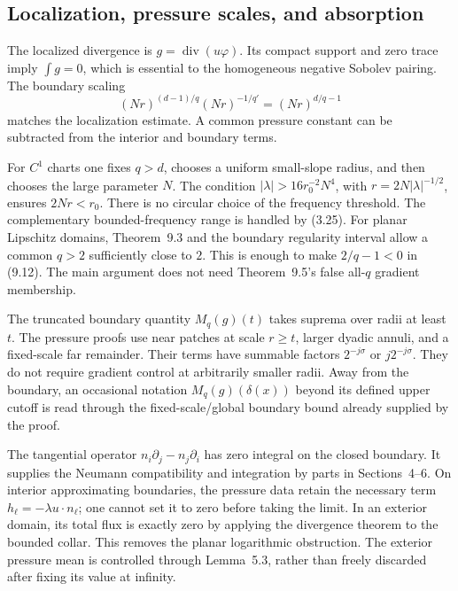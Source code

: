 \documentclass[10pt]{article}
\begin{document}
\subsection*{Localization, pressure scales, and absorption}
The localized divergence is \(g=\operatorname{div}(u\varphi)\). Its compact support and zero trace imply \(\int g=0\), which is essential to the homogeneous negative Sobolev pairing. The boundary scaling \[(Nr)^{(d-1)/q}(Nr)^{-1/q'}=(Nr)^{d/q-1}\] matches the localization estimate. A common pressure constant can be subtracted from the interior and boundary terms.\par
For \(C^1\) charts one fixes \(q>d\), chooses a uniform small-slope radius, and then chooses the large parameter \(N\). The condition \(|\lambda|>16r_0^{-2}N^4\), with \(r=2N|\lambda|^{-1/2}\), ensures \(2Nr<r_0\). There is no circular choice of the frequency threshold. The complementary bounded-frequency range is handled by (3.25). For planar Lipschitz domains, Theorem 9.3 and the boundary regularity interval allow a common \(q>2\) sufficiently close to \(2\). This is enough to make \(2/q-1<0\) in (9.12). The main argument does not need Theorem 9.5’s false all-\(q\) gradient membership.\par
The truncated boundary quantity \(M_q(g)(t)\) takes suprema over radii at least \(t\). The pressure proofs use near patches at scale \(r\ge t\), larger dyadic annuli, and a fixed-scale far remainder. Their terms have summable factors \(2^{-j\sigma}\) or \(j2^{-j\sigma}\). They do not require gradient control at arbitrarily smaller radii. Away from the boundary, an occasional notation \(M_q(g)(\delta(x))\) beyond its defined upper cutoff is read through the fixed-scale/global boundary bound already supplied by the proof.\par
The tangential operator \(n_i\partial_j-n_j\partial_i\) has zero integral on the closed boundary. It supplies the Neumann compatibility and integration by parts in Sections 4–6. On interior approximating boundaries, the pressure data retain the necessary term \(h_\ell=-\lambda u\cdot n_\ell\); one cannot set it to zero before taking the limit. In an exterior domain, its total flux is exactly zero by applying the divergence theorem to the bounded collar. This removes the planar logarithmic obstruction. The exterior pressure mean is controlled through Lemma 5.3, rather than freely discarded after fixing its value at infinity.\par
\end{document}

